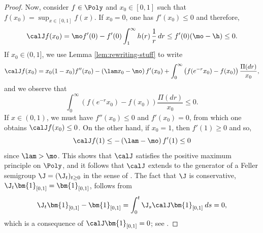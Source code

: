 \begin{proof}
Now, consider $f \in \Poly$ and $x_0 \in [0,1]$ such that $f(x_0)=\sup_{x\in [0,1]} f(x)$.
If $x_0 = 0$, one has $f'(x_0) \le 0$ and therefore,
\[
\calJ f(x_0) = \mo f'(0) - f'(0) \int_1^{\infty} h(r)\,\frac{1}{r}\, dr \le f'(0) (\mo - \h) \le 0.
\]
If $x_0 \in (0,1]$, we use Lemma \ref{lem:rewriting-stuff} to write\vspace*{-3pt}
\[
\calJ f(x_0) = x_0 (1-x_0)f''(x_0)-\left(\lam x_0-\mo\right)f'(x_0)+\int_{0}^{\infty}\left(f(e^{-r}x_0)-f(x_0)\right) \frac{\Pi(dr)}{x_0},
\]
and we observe that\vspace*{-3pt}
\begin{equation*}
\int_{0}^{\infty} \left(f(e^{-r}x_0)-f(x_0)\right) \frac{\Pi(dr)}{x_0} \leq 0.
\end{equation*}
If $x \in (0,1)$, we must have $f''(x_0)\leq 0$ and $f'(x_0)=0$, from which one obtains $\calJ f(x_0)\leq 0$. On the other hand, if $x_0=1$, then $f'(1)\geq 0$ and so,
\[
\calJ f(1)\leq -\left(\lam-\mo \right)f'(1) \leq 0
\]
since $\lam > \mo$.
This shows that $\calJ$ satisfies the positive maximum principle on $\Poly$, and it follows that $\calJ$ extends to the generator of a Feller semigroup $\J = (\J_t)_{t \geq 0}$ in the sense of \cite[Th.\,1.30]{Levy-Matters-III}. The fact that $\J$ is conservative, \ie $\J_t \bm{1}_{[0,1]} = \bm{1}_{[0,1]}$, follows from
\begin{equation*}
\J_t \bm{1}_{[0,1]} - \bm{1}_{[0,1]} = \int_0^t \J_s \calJ \bm{1}_{[0,1]} \: ds = 0,
\end{equation*}
which is a consequence of $\calJ \bm{1}_{[0,1]} = 0$;
see \eg \cite[Lem.\,1.26]{Levy-Matters-III}.
\end{proof}

